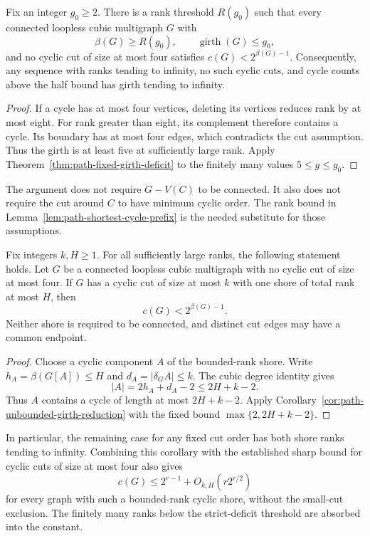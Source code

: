 \begin{corollary}
\label{cor:path-unbounded-girth-reduction}
Fix an integer $g_0\ge2$.
There is a rank threshold $R(g_0)$ such that every connected loopless cubic multigraph $G$ with
\[
 \beta(G)\ge R(g_0),\qquad \operatorname{girth}(G)\le g_0,
\]
and no cyclic cut of size at most four satisfies $c(G)<2^{\beta(G)-1}$.
Consequently, any sequence with ranks tending to infinity, no such cyclic cuts, and cycle counts above the half bound has girth tending to infinity.
\end{corollary}

\begin{proof}
If a cycle has at most four vertices, deleting its vertices reduces rank by at most eight.
For rank greater than eight, its complement therefore contains a cycle.
Its boundary has at most four edges, which contradicts the cut assumption.
Thus the girth is at least five at sufficiently large rank.
Apply Theorem~\ref{thm:path-fixed-girth-deficit} to the finitely many values $5\le g\le g_0$.
\end{proof}

The argument does not require $G-V(C)$ to be connected.
It also does not require the cut around $C$ to have minimum cyclic order.
The rank bound in Lemma~\ref{lem:path-shortest-cycle-prefix} is the needed substitute for those assumptions.

\begin{corollary}
\label{cor:path-bounded-shore-any-order}
Fix integers $k,H\ge1$.
For all sufficiently large ranks, the following statement holds.
Let $G$ be a connected loopless cubic multigraph with no cyclic cut of size at most four.
If $G$ has a cyclic cut of size at most $k$ with one shore of total rank at most $H$, then
\[
 c(G)<2^{\beta(G)-1}.
\]
Neither shore is required to be connected, and distinct cut edges may have a common endpoint.
\end{corollary}

\begin{proof}
Choose a cyclic component $A$ of the bounded-rank shore.
Write $h_A=\beta(G[A])\le H$ and $d_A=|\delta_G A|\le k$.
The cubic degree identity gives
\[
 |A|=2h_A+d_A-2\le2H+k-2.
\]
Thus $A$ contains a cycle of length at most $2H+k-2$.
Apply Corollary~\ref{cor:path-unbounded-girth-reduction} with the fixed bound $\max\{2,2H+k-2\}$.
\end{proof}

In particular, the remaining case for any fixed cut order has both shore ranks tending to infinity.
Combining this corollary with the established sharp bound for cyclic cuts of size at most four also gives
\[
 c(G)\le2^{r-1}+O_{k,H}(r2^{r/2})
\]
for every graph with such a bounded-rank cyclic shore, without the small-cut exclusion.
The finitely many ranks below the strict-deficit threshold are absorbed into the constant.

